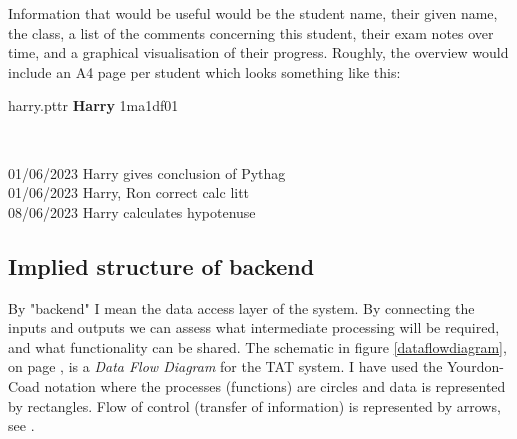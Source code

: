 \documentclass[10pt]{article}
\begin{document}
Information that would be useful would be the student name, their given name, the class, a list of the comments concerning this student, their exam notes over time, and a graphical visualisation of their progress. Roughly, the overview would include an A4 page per student which looks something like this:

\begin{center}
\begin{tcolorbox}

harry.pttr \hfill \textbf{Harry} \hfill 1ma1df01

\

\small{
01/06/2023 Harry gives conclusion of Pythag \\
01/06/2023 Harry, Ron correct calc litt \\
08/06/2023 Harry calculates hypotenuse
}

\vspace{10mm}

\begin{center}
\end{center}

\end{tcolorbox}
\end{center}


\subsection{Implied structure of backend}

By "backend" I mean the data access layer of the system. By connecting the inputs and outputs we can assess what intermediate processing will be required, and what functionality can be shared. The schematic in figure \ref{dataflowdiagram}, on page \pageref{dataflowdiagram}, is a \emph{Data Flow Diagram} for the TAT system. I have used the Yourdon-Coad notation where the processes (functions) are circles and data is represented by rectangles. Flow of control (transfer of information) is represented by arrows, see \cite{Coad91}.
\end{document}
